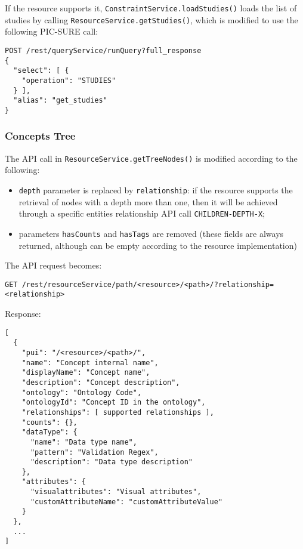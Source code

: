 If the resource supports it, \verb|ConstraintService.loadStudies()| loads the list of studies by calling \verb|ResourceService.getStudies()|, which is modified to use the following PIC-SURE call:
\begin{verbatim}
POST /rest/queryService/runQuery?full_response
{
  "select": [ {
    "operation": "STUDIES"
  } ],
  "alias": "get_studies"
}
\end{verbatim}




\subsubsection{Concepts Tree}
\label{sec:gb-tree}

The API call in \verb|ResourceService.getTreeNodes()| is modified according to the following:
\begin{itemize}
     \item \verb|depth| parameter is replaced by \verb|relationship|: if the resource supports the retrieval of nodes with a depth more than one, then it will be achieved through a specific entities relationship API call \verb|CHILDREN-DEPTH-X|; 
    \item parameters \verb|hasCounts| and \verb|hasTags| are removed (these fields are always returned, although can be empty according to the resource implementation)
\end{itemize}

The API request becomes:
\begin{verbatim}
GET /rest/resourceService/path/<resource>/<path>/?relationship=<relationship>
\end{verbatim}

Response:
\begin{verbatim}
[
  {
    "pui": "/<resource>/<path>/",
    "name": "Concept internal name",
    "displayName": "Concept name",
    "description": "Concept description",
    "ontology": "Ontology Code",
    "ontologyId": "Concept ID in the ontology",
    "relationships": [ supported relationships ],
    "counts": {},
    "dataType": {
      "name": "Data type name",
      "pattern": "Validation Regex",
      "description": "Data type description"
    },
    "attributes": {
      "visualattributes": "Visual attributes",
      "customAttributeName": "customAttributeValue"
    }
  },
  ...
]
\end{verbatim}

